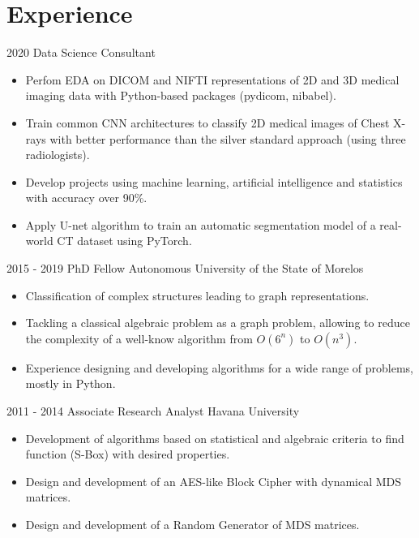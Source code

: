 \documentclass[]{friggeri-cv}
\begin{document}
\section{Experience}
\begin{entrylist}
    \entry
    {2020}
    {Data Science Consultant}
    {}
    {\vspace{-.1in}
\begin{itemize}
\item  Perfom EDA on  DICOM and NIFTI representations of 2D and 3D medical imaging data with  Python-based  packages (pydicom, nibabel).
\item Train common CNN architectures to classify 2D medical images of Chest X-rays with better performance than the silver standard approach (using three radiologists).
\item   Develop  projects using machine learning, artificial intelligence and statistics with  accuracy over  90\%.
\item  Apply U-net algorithm to train an automatic segmentation
 model of a real-world CT dataset using PyTorch.
\end{itemize}    
   }
    \entry
    {2015 - 2019}
    {PhD Fellow}
    {Autonomous University of the State of Morelos}
    {\vspace{-.1in}
\begin{itemize}
  \item Classification of complex structures leading to graph representations.
\item Tackling a classical algebraic problem as a graph problem, allowing to reduce the complexity of a well-know algorithm from $O(6^n)$ to $O(n^3)$. 
\item  Experience designing and developing algorithms for a wide range of problems, mostly in Python.  
\end{itemize}    
   }
  \entry
    {2011 - 2014}
    { Associate Research Analyst}
    {Havana University}
    { \vspace{-.1in}
    \begin{itemize}
    \item  Development of algorithms based on statistical and algebraic criteria to find function (S-Box) with desired properties.
    \item Design and development of an AES-like  Block Cipher with dynamical MDS matrices.
    \item Design and development of a Random Generator of MDS matrices.
    \end{itemize}
 } 
\end{entrylist}\vspace*{-0.1in}
\end{document}
